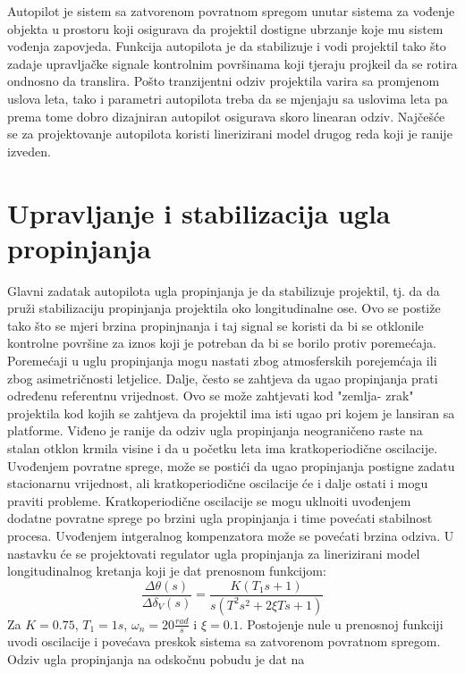 Autopilot je sistem sa zatvorenom povratnom spregom unutar sistema za vođenje objekta 
u prostoru koji osigurava da projektil dostigne ubrzanje koje mu sistem vođenja zapovjeda. 
Funkcija autopilota je da stabilizuje i vodi projektil tako što zadaje upravljačke signale kontrolnim 
površinama koji tjeraju projkeil da se rotira ondnosno da translira.  
Pošto tranzijentni odziv projektila varira sa promjenom uslova leta, tako i parametri 
autopilota treba da se mjenjaju sa uslovima leta pa prema tome dobro 
dizajniran autopilot osigurava skoro linearan odziv. Najčešće se za projektovanje 
autopilota koristi linerizirani model drugog reda koji je ranije izveden. 
\section{Upravljanje i stabilizacija ugla propinjanja}
Glavni zadatak autopilota ugla propinjanja je da stabilizuje projektil, tj. da 
da pruži stabilizaciju propinjanja projektila oko longitudinalne ose. Ovo se postiže tako 
što se mjeri brzina propinjnanja i taj signal se koristi da bi se otklonile 
kontrolne površine za iznos koji je potreban da bi se borilo protiv poremećaja. 
Poremećaji u uglu propinjanja mogu nastati zbog atmosferskih porejemćaja ili 
zbog asimetričnosti letjelice. Dalje, često se zahtjeva da ugao propinjanja prati 
određenu referentnu vrijednost. Ovo se može zahtjevati kod "zemlja- zrak" projektila 
kod kojih se zahtjeva da projektil ima isti ugao pri kojem je lansiran sa platforme. 
Viđeno je ranije da odziv ugla propinjanja neograničeno raste na stalan otklon krmila visine 
i da u početku leta ima kratkoperiodične oscilacije. Uvođenjem povratne sprege,
može se postići da ugao propinjanja postigne zadatu stacionarnu vrijednost, ali kratkoperiodične 
oscilacije će i dalje ostati i mogu praviti probleme. Kratkoperiodične 
oscilacije se mogu uklnoiti uvođenjem dodatne povratne sprege po brzini ugla propinjanja 
i time povećati stabilnost procesa. Uvođenjem intgeralnog kompenzatora može se povećati brzina odziva.
U nastavku će se projektovati regulator ugla propinjanja za linerizirani model longitudinalnog kretanja 
koji je dat prenosnom funkcijom:
\begin{equation}
    \frac{\Delta \theta(s)}{\Delta \delta_V(s)}=\frac{K(T_1s+1)}{s(T^2s^2+2\xi Ts+1)}
\end{equation}
Za $K=0.75$, $T_1 = 1s$, $\omega _n = 20 \frac{rad}{s}$ i $\xi = 0.1$. 
Postojenje nule u prenosnoj funkciji uvodi oscilacije i povećava preskok sistema sa 
zatvorenom povratnom spregom. Odziv ugla propinjanja na odskočnu pobudu  je dat na 
